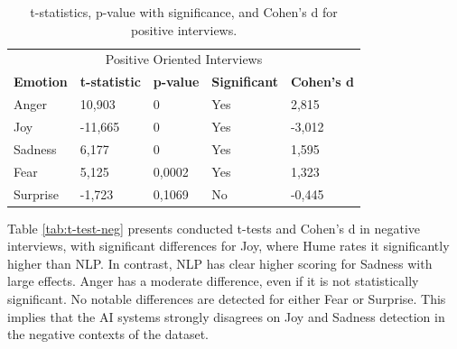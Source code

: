  \begin{table}[!h]
    \centering
    \begin{tabular}{lllll}
    \multicolumn{5}{c}{\cellcolor[HTML]{C0C0C0}Positive Oriented Interviews}                                                                                                                                    \\
    \multicolumn{1}{c|}{\textbf{Emotion}} & \multicolumn{1}{c}{\textbf{t-statistic}} & \multicolumn{1}{c}{\textbf{p-value}} & \multicolumn{1}{c}{\textbf{Significant}} & \multicolumn{1}{c}{\textbf{Cohen's d}} \\ \hline
    \multicolumn{1}{l|}{Anger}            & 10,903                                   & 0                                    & Yes                                      & 2,815                                  \\
    \multicolumn{1}{l|}{Joy}              & -11,665                                  & 0                                    & Yes                                      & -3,012                                 \\
    \multicolumn{1}{l|}{Sadness}          & 6,177                                    & 0                                    & Yes                                      & 1,595                                  \\
    \multicolumn{1}{l|}{Fear}             & 5,125                                    & 0,0002                               & Yes                                      & 1,323                                  \\
    \multicolumn{1}{l|}{Surprise}         & -1,723                                   & 0,1069                               & No                                       & -0,445                                
    \end{tabular}
    \caption{t-statistics, p-value with significance, and Cohen's d for positive interviews.}
    \label{tab:t-test-pos}
\end{table}

Table \ref{tab:t-test-neg} presents conducted t-tests and Cohen's d in negative interviews, with significant differences for Joy, where Hume rates it significantly higher than NLP. 
In contrast, NLP has clear higher scoring for Sadness with large effects. 
Anger has a moderate difference, even if it is not statistically significant. No notable differences are detected for either Fear or Surprise. 
This implies that the AI systems strongly disagrees on Joy and Sadness detection in the negative contexts of the dataset. 

